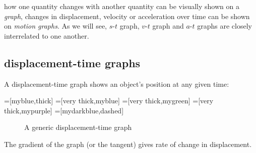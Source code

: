 how one quantity changes with another quantity can be visually shown on a \emph{graph}, changes in displacement, velocity or acceleration over time can be shown on \emph{motion graphs}. As we will see, $s$-$t$ graph, $v$-$t$ graph and $a$-$t$ graphs are closely interrelated to one another.

\subsection{displacement-time graphs}

A displacement-time graph shows an object's position at any given time:

=[myblue,thick]
=[very thick,myblue]
=[very thick,mygreen]
=[very thick,mypurple]
=[mydarkblue,dashed]

\def\tick#1#2{\draw[thick] (#1) ++ (#2:0.1) --++ (#2-180:0.2)}
\def\tlabel{$t\,\left[\text{s}\right]$}
\def\vlabel{$d\,\left[\text{m}\right]$}
\def\alabel{$a\,\left[\si{m/s^2}\right]$}

\begin{figure}
    \centering
    \def\xmax{5.5} %
\def\ymax{3.0} %
\def\tmax{16} %
    \caption{A generic displacement-time graph}
    \label{fig:enter-label}
\end{figure}
The gradient of the graph (or the tangent) gives rate of change in displacement.

